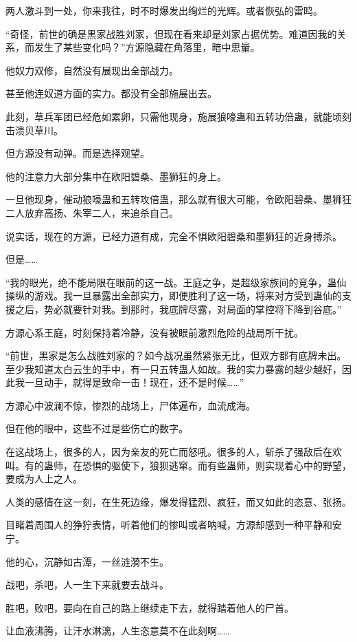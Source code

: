\begin{this_body}
两人激斗到一处，你来我往，时不时爆发出绚烂的光辉。或者恢弘的雷鸣。

“奇怪，前世的确是黑家战胜刘家，但现在看来却是刘家占据优势。难道因我的关系，而发生了某些变化吗？”方源隐藏在角落里，暗中思量。

他奴力双修，自然没有展现出全部战力。

甚至他连奴道方面的实力。都没有全部施展出去。

此刻，草兵军团已经危如累卵，只需他现身，施展狼嚎蛊和五转功倍蛊，就能顷刻击溃贝草川。

但方源没有动弹。而是选择观望。

他的注意力大部分集中在欧阳碧桑、墨狮狂的身上。

一旦他现身，催动狼嚎蛊和五转攻倍蛊，那么就有很大可能，令欧阳碧桑、墨狮狂二人放弃高扬、朱宰二人，来追杀自己。

说实话，现在的方源，已经力道有成，完全不惧欧阳碧桑和墨狮狂的近身搏杀。

但是……

“我的眼光，绝不能局限在眼前的这一战。王庭之争，是超级家族间的竞争，蛊仙操纵的游戏。我一旦暴露出全部实力，即便胜利了这一场，将来对方受到蛊仙的支援之后，势必就要针对我。到那时，我底牌尽露，对局面的掌控将下降到谷底。”

方源心系王庭，时刻保持着冷静，没有被眼前激烈危险的战局所干扰。

“前世，黑家是怎么战胜刘家的？如今战况虽然紧张无比，但双方都有底牌未出。至少我知道太白云生的手中，有一只五转蛊人如故。我的实力暴露的越少越好，因此我一旦动手，就得是致命一击！现在，还不是时候……”

方源心中波澜不惊，惨烈的战场上，尸体遍布，血流成海。

但在他的眼中，这些不过是些伤亡的数字。

在这战场上，很多的人，因为亲友的死亡而怒吼。很多的人，斩杀了强敌后在欢叫。有的蛊师，在恐惧的驱使下，狼狈逃窜。而有些蛊师，则实现着心中的野望，要成为人上之人。

人类的感情在这一刻，在生死边缘，爆发得猛烈、疯狂，而又如此的恣意、张扬。

目睹着周围人的狰狞表情，听着他们的惨叫或者呐喊，方源却感到一种平静和安宁。

他的心，沉静如古潭，一丝涟漪不生。

战吧，杀吧，人一生下来就要去战斗。

胜吧，败吧，要向在自己的路上继续走下去，就得踏着他人的尸首。

让血液沸腾，让汗水淋漓，人生恣意莫不在此刻啊……


\end{this_body}

